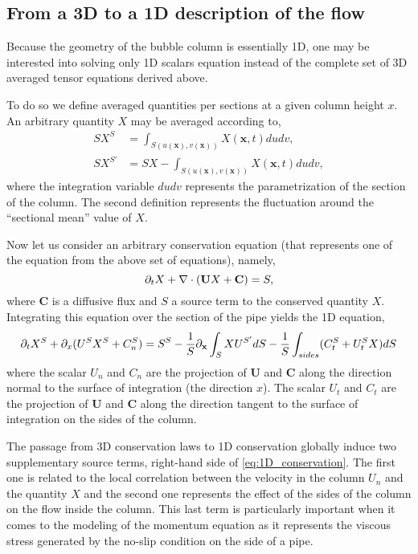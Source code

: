 \subsection{From a 3D to a 1D description of the flow}

Because the geometry of the bubble column is essentially 1D, one may be interested into solving only 1D scalars equation instead of the complete set of 3D averaged tensor equations derived above. 

To do so we define averaged quantities per sections at a given column height $x$.
An arbitrary quantity $X$ may be averaged according to, 
\begin{align*}
    S X^S &= \int_{S(u(\textbf{x}),v(\textbf{x}))} X(\textbf{x},t)dudv,\\
    S X^{S'} &=S  X - \int_{S(u(\textbf{x}),v(\textbf{x}))} X(\textbf{x},t)dudv,
\end{align*}
where the integration variable $dudv$ represents the parametrization of the section of the column.  
The second definition represents the fluctuation around the ``sectional mean'' value of $X$. 

Now let us consider an arbitrary conservation equation (that represents one of the equation from the above set of equations), namely,
\begin{equation}
    \partial_t X + \mathbf{\nabla}\cdot(\textbf{U} X + \textbf{C}) = S,
\end{equation}
where $\textbf{C}$ is a diffusive flux and $S$ a source term to the conserved quantity $X$. 
Integrating this equation over the section of the pipe yields the 1D equation, 
\begin{equation}
    \pddt X^S + \partial_x(U^S X^S +  C_n^S) 
    = S^S
    - \frac{1}{S}\pddx\int_S X U^{S'}dS
    - \frac{1}{S}\int_{sides}( C_t^S+U_t^S X )dS 
    \label{eq:1D_conservation}
\end{equation}
where the scalar ${U}_n$ and $C_n$ are the projection of $\textbf{U}$ and $\textbf{C}$ along the direction normal to the surface of integration (the direction $x$). 
The scalar ${U}_t$ and $C_t$ are the projection of $\textbf{U}$ and $\textbf{C}$ along the direction tangent to the surface of integration on the sides of the column. 

The passage from 3D conservation laws to 1D conservation globally induce two supplementary source terms, right-hand side of \ref{eq:1D_conservation}. 
The first one is related to the local correlation between the velocity in the column $U_n$ and the quantity $X$ and the second one represents the effect of the sides of the column on the flow inside the column. 
This last term is particularly important when it comes to the modeling of the momentum equation as it represents the viscous stress generated by the no-slip condition on the side of a pipe. 


